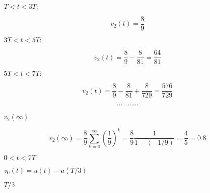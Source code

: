 {\newpage\clearpage
{}%
$T<t<3T:$%
\lthtmlinlinemathZ
\lthtmlcheckvsize\clearpage}

{\newpage\clearpage
{}%
\begin{displaymath}	v_2(t)=\frac{8}{9}	\end{displaymath}%
\lthtmldisplayZ
\lthtmlcheckvsize\clearpage}

{\newpage\clearpage
{}%
$3T<t<5T:$%
\lthtmlinlinemathZ
\lthtmlcheckvsize\clearpage}

{\newpage\clearpage
{}%
\begin{displaymath} v_2(t)=\frac{8}{9}-\frac{8}{81}=\frac{64}{81} \end{displaymath}%
\lthtmldisplayZ
\lthtmlcheckvsize\clearpage}

{\newpage\clearpage
{}%
$5T<t<7T:$%
\lthtmlinlinemathZ
\lthtmlcheckvsize\clearpage}

{\newpage\clearpage
{}%
\begin{displaymath} v_2(t)=\frac{8}{9}-\frac{8}{81}+\frac{8}{729}=\frac{576}{729} \end{displaymath}%
\lthtmldisplayZ
\lthtmlcheckvsize\clearpage}

{\newpage\clearpage
{}%
\begin{displaymath}	\cdots  \cdots  \cdots  \cdots  \end{displaymath}%
\lthtmldisplayZ
\lthtmlcheckvsize\clearpage}

{\newpage\clearpage
{}%
$v_2(\infty)$%
\lthtmlinlinemathZ
\lthtmlcheckvsize\clearpage}

{\newpage\clearpage
{}%
\begin{displaymath} v_2(\infty)=\frac{8}{9}\sum_{k=0}^\infty \left(\frac{1}{9}\right)^k
  =\frac{8}{9}\frac{1}{1-(-1/9)}=\frac{4}{5}=0.8 \end{displaymath}%
\lthtmldisplayZ
\lthtmlcheckvsize\clearpage}

{\newpage\clearpage
{}%
$0<t<7T$%
\lthtmlinlinemathZ
\lthtmlcheckvsize\clearpage}

{\newpage\clearpage
{}%
$v_0(t)=u(t)-u(T/3)$%
\lthtmlinlinemathZ
\lthtmlcheckvsize\clearpage}

{\newpage\clearpage
{}%
$T/3$%
\lthtmlinlinemathZ
\lthtmlcheckvsize\clearpage}

